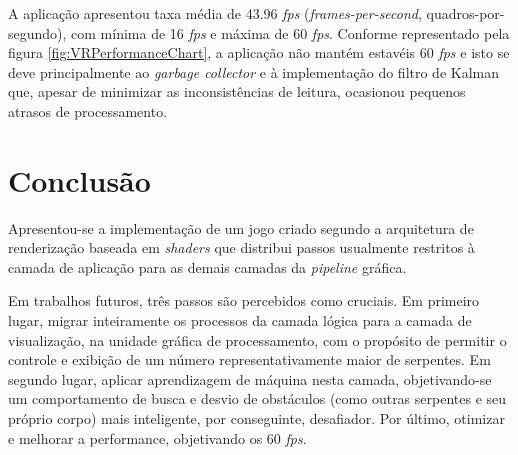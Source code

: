 \documentclass[conference]{IEEEtran}
\begin{document}
A aplicação apresentou taxa média de 43.96 \textit{fps} (\textit{frames-per-second}, quadros-por-segundo), com mínima de 16 \textit{fps} e máxima de 60 \textit{fps}. Conforme representado pela figura \ref{fig:VRPerformanceChart}, a aplicação não mantém estavéis 60 \textit{fps} e isto se deve principalmente ao \textit{garbage collector} e à implementação do filtro de Kalman que, apesar de minimizar as inconsistências de leitura, ocasionou pequenos atrasos de processamento.

\section{Conclusão}\label{sec:conclusion}
Apresentou-se a implementação de um jogo criado segundo a arquitetura de renderização baseada em \textit{shaders} que distribui passos usualmente restritos à camada de aplicação para as demais camadas da \textit{pipeline} gráfica.

Em trabalhos futuros, três passos são percebidos como cruciais. Em primeiro lugar, migrar inteiramente os processos da camada lógica para a camada de visualização, na unidade gráfica de processamento, com o propósito de permitir o controle e exibição de um número representativamente maior de serpentes. Em segundo lugar, aplicar aprendizagem de máquina nesta camada, objetivando-se um comportamento de busca e desvio de obstáculos (como outras serpentes e seu próprio corpo) mais inteligente, por conseguinte, desafiador. Por último, otimizar e melhorar a performance, objetivando os 60 \textit{fps}.



%
%
%


% 





\end{document}
